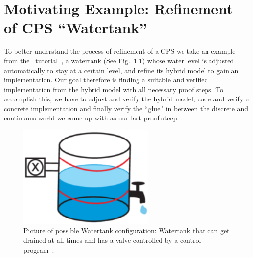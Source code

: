 



\chapter{Motivating Example: Refinement of CPS ``Watertank''}
\label{ch:Watertank}

To better understand the process of refinement of a CPS we take an example from the \keym~tutorial~\cite{keymaera}, a watertank (See Fig.~\ref{fig:watertank}) whose water level is adjusted automatically to stay at a certain level, and refine its hybrid model to gain an implementation. Our goal therefore is finding a suitable and verified implementation from the hybrid model with all necessary proof steps. To accomplish this, we have to adjust and verify the hybrid model, code and verify a concrete implementation and finally verify the ``glue'' in between the discrete and continuous world we come up with as our last proof steep. 

\begin{figure}[h!]
	\setcounter{figure}{0}
	\centering
	\includegraphics[width=0.6\textwidth]{images/watertank}
	\caption{Picture of possible Watertank configuration: Watertank that can get drained at all times and has a valve controlled by a control program~\cite{keymaeraGuide}.}
	\label{fig:watertank}
\end{figure}

